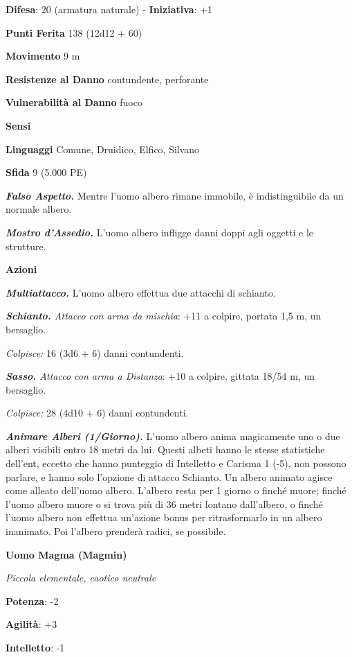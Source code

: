 \begin{multicols}{2}
\textbf{Difesa}: 20 (armatura naturale) - \textbf{Iniziativa}: +1

\textbf{Punti Ferita} 138 (12d12 + 60)

\textbf{Movimento} 9 m

\textbf{Resistenze al Danno} contundente, perforante

\textbf{Vulnerabilità al Danno} fuoco

\textbf{Sensi} 

\textbf{Linguaggi} Comune, Druidico, Elfico, Silvano

\textbf{Sfida} 9 (5.000 PE)

\emph{\textbf{Falso Aspetto.}} Mentre l'uomo albero rimane immobile, è
indistinguibile da un normale albero.

\emph{\textbf{Mostro d'Assedio.}} L'uomo albero infligge danni doppi
agli oggetti e le strutture.

\textbf{Azioni}

\emph{\textbf{Multiattacco.}} L'uomo albero effettua due attacchi di
schianto.

\emph{\textbf{Schianto.} Attacco con arma da mischia}: +11 a colpire,
portata 1,5 m, un bersaglio.

\emph{Colpisce:} 16 (3d6 + 6) danni contundenti.

\emph{\textbf{Sasso.} Attacco con arma a Distanza}: +10 a colpire,
gittata 18/54 m, un bersaglio.

\emph{Colpisce:} 28 (4d10 + 6) danni contundenti.

\emph{\textbf{Animare Alberi (1/Giorno).}} L'uomo albero anima
magicamente uno o due alberi visibili entro 18 metri da lui. Questi
albeti hanno le stesse statistiche dell'ent, eccetto che hanno punteggio
di Intelletto e Carisma 1 (-5), non possono parlare, e hanno solo
l'opzione di attacco Schianto. Un albero animato agisce come alleato
dell'uomo albero. L'albero resta per 1 giorno o finché muore; finché
l'uomo albero muore o si trova più di 36 metri lontano dall'albero, o
finché l'uomo albero non effettua un'azione bonus per ritrasformarlo in
un albero inanimato. Poi l'albero prenderà radici, se possibile.



\textbf{Uomo Magma (Magmin)}

\emph{Piccola elementale, caotico neutrale}

\textbf{Potenza}: -2

\textbf{Agilità}: +3

\textbf{Intelletto}: -1


\end{multicols}
